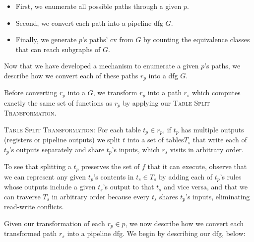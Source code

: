 \begin{itemize}
  \item First, we enumerate all possible paths through a given $p$.

  \item Second, we convert each path into a pipeline dfg $G$.

  \item Finally, we generate $p$'s paths' cv from $G$ by counting the equivalence classes that can reach subgraphs of $G$.
\end{itemize}


 Now that we have developed a mechanism to enumerate a given $p$'s paths, we describe how we convert each of these paths $r_p$ into a dfg $G$.

Before converting $r_p$ into a $G$, we transform $r_p$ into a path $r_s$ which computes exactly the same set of functions as $r_p$ by applying our \textsc{Table Split Transformation}.

\vspace{2mm}
\textsc{Table Split Transformation:} For each table $t_p \in r_p$, if $t_p$ has multiple outputs (registers or pipeline outputs) we split $t$ into a set of tables$T_s$ that write each of $t_p$'s outputs separately and share $t_p$'s inputs, which $r_s$ visits in arbitrary order.
\vspace{2mm}

To see that splitting a $t_p$ preserves the set of $f$ that it can execute, observe that  we can represent any given $t_p$'s contents in $t_s \in T_s$ by adding each of $t_p$'s rules whose outputs include a given $t_s$'s output to that $t_s$ and vice versa, and that we can traverse $T_s$ in arbitrary order because every $t_s$ shares $t_p$'s inputs, eliminating read-write conflicts.

Given our transformation of each $r_p \in p$, we now describe how we convert each transformed path $r_s$ into a pipeline dfg. We begin by describing our dfg, below:

